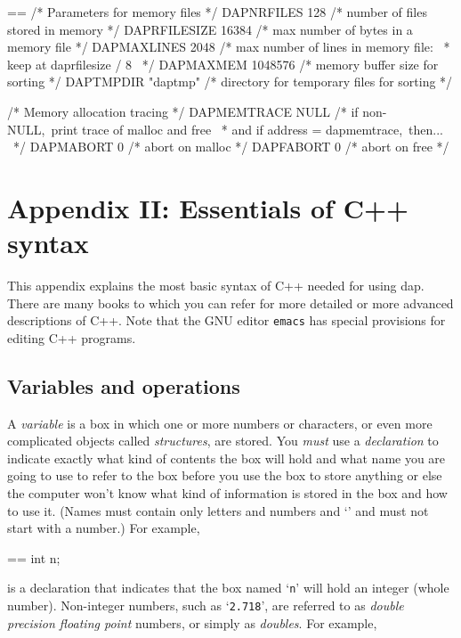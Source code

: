 \documentclass{book}
\makeatletter
\newenvironment{Texinfopreformatted}{%
  \par\GNUTobeylines\obeyspaces\frenchspacing\parskip=\z@\parindent=\z@}{}
{\catcode`\^^M=13 \gdef\GNUTobeylines{\catcode`\^^M=13 \def^^M{\null\par}}}
\newenvironment{Texinfoindented}{\begin{list}{}{}\item\relax}{\end{list}}
\renewcommand{\_}{\Texinfounderscore\discretionary{}{}{}}
\makeatother
\begin{document}
\begin{Texinfoindented}
\begin{Texinfopreformatted}
/* Parameters for memory files */
DAP\_NRFILES 128  /* number of files stored in memory */
DAP\_RFILESIZE 16384  /* max number of bytes in a memory file */
DAP\_MAXLINES 2048  /* max number of lines in memory file:
\                    * keep at dap\_rfilesize / 8
\                    */
DAP\_MAXMEM 1048576 /* memory buffer size for sorting */
DAP\_TMPDIR "dap\_tmp" /* directory for temporary files for sorting */

/* Memory allocation tracing */
DAP\_MEMTRACE NULL  /* if non-NULL,\ print trace of malloc and free
\                    * and if address = dap\_memtrace,\ then...
\                    */
DAP\_MABORT 0  /* abort on malloc */
DAP\_FABORT 0  /* abort on free */
\end{Texinfopreformatted}
\end{Texinfoindented}

\chapter*{{Appendix II: Essentials of C++ syntax}}
\label{anchor:Appendix-II}%

This appendix explains the most basic syntax of C++ needed for using dap.
There are many books to which you can refer for more detailed or
more advanced descriptions of C++.
Note that the GNU editor \texttt{emacs} has special provisions for editing
C++ programs.


\section{{Variables and operations}}
\label{anchor:Variables-and-operations}%

A \textsl{variable} is a box in which one or more numbers or characters,
or even more complicated objects called \textsl{structures}, are stored.
You \emph{must} use a \textsl{declaration}
%
%
%
%
to indicate exactly what kind of contents the box will hold and what
name you are going to use to refer to the box before you
use the box to store anything or else the computer won't know
what kind of information is stored in the box and how to use it.
(Names must contain only letters and numbers and `\texttt{\_}' and
must not start with a number.)
For example,

\begin{Texinfoindented}
\begin{Texinfopreformatted}%
\ttfamily int n;
\end{Texinfopreformatted}
\end{Texinfoindented}
\noindent{}is a declaration that
indicates that the box named `\texttt{n}' will hold an integer
%
(whole number).
Non-integer numbers, such as `\texttt{2.718}', are referred to as
\textsl{double precision floating point} numbers, or simply as
\textsl{doubles}.
%
For example,
\end{document}
